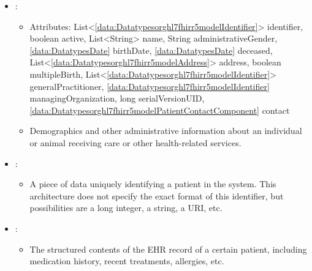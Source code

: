 \begin{itemize}[nolistsep,noitemsep]
\begin{itemize}[noitemsep,nolistsep]
\item[] Enum: \textsc{registered}, \textsc{preliminary}, \textsc{final}, \textsc{amended}, \textsc{corrected}, \textsc{cancelled}, \textsc{enteredinerror}, \textsc{unknown}, \textsc{null}.\\The status of the observation result value or the RiskAssessment.
\end{itemize}

\item {}: 
\begin{itemize}[noitemsep,nolistsep]
\item[] Attributes: List\textless{}\ref{data:Datatypesorghl7fhirr5modelIdentifier}\textgreater{} identifier, boolean active, List\textless{}String\textgreater{} name, String administrativeGender, \ref{data:DatatypesDate} birthDate, \ref{data:DatatypesDate} deceased, List\textless{}\ref{data:Datatypesorghl7fhirr5modelAddress}\textgreater{} address, boolean multipleBirth, List\textless{}\ref{data:Datatypesorghl7fhirr5modelIdentifier}\textgreater{} generalPractitioner, \ref{data:Datatypesorghl7fhirr5modelIdentifier} managingOrganization, long serialVersionUID, \ref{data:Datatypesorghl7fhirr5modelPatientContactComponent} contact
\item[] Demographics and other administrative information about an individual or animal receiving care or other health-related services.
\end{itemize}

\item {}: 
\begin{itemize}[noitemsep,nolistsep]

\item[] A piece of data uniquely identifying a patient in the system. This architecture does not
specify the exact format of this identifier, but possibilities are a long integer, a string, a URI, etc.
\end{itemize}

\item {}: 
\begin{itemize}[noitemsep,nolistsep]

\item[] The structured contents of the EHR record of a certain patient, including medication history, recent treatments, allergies, etc.
\end{itemize}


\end{itemize}
